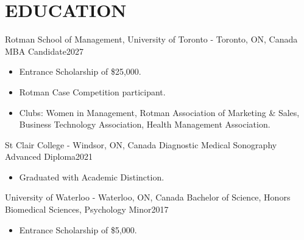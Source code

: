 
\section{\textcolor{airforceblue}{EDUCATION}}
  \employmentSubheadingListStart
    \employmentSubheading
      {Rotman School of Management, University of Toronto - Toronto, ON, Canada}{}
      {MBA Candidate}{2027}
      \begin{itemize}[leftmargin=1.5em]
        \item Entrance Scholarship of \$25,000.
        \item Rotman Case Competition participant.
        \item Clubs: Women in Management, Rotman Association of Marketing \& Sales, Business Technology Association, Health Management Association.
      \end{itemize}
    \employmentSubheading
      {St Clair College - Windsor, ON, Canada}{}
      {Diagnostic Medical Sonography Advanced Diploma}{2021}
      \begin{itemize}[leftmargin=1.5em]
        \item Graduated with Academic Distinction.
      \end{itemize}
    \employmentSubheading
      {University of Waterloo - Waterloo, ON, Canada}{}
      {Bachelor of Science, Honors Biomedical Sciences, Psychology Minor}{2017}
      \begin{itemize}[leftmargin=1.5em]
        \item Entrance Scholarship of \$5,000.
      \end{itemize}
  \employmentSubheadingListEnd
  \vspace{-16pt}
